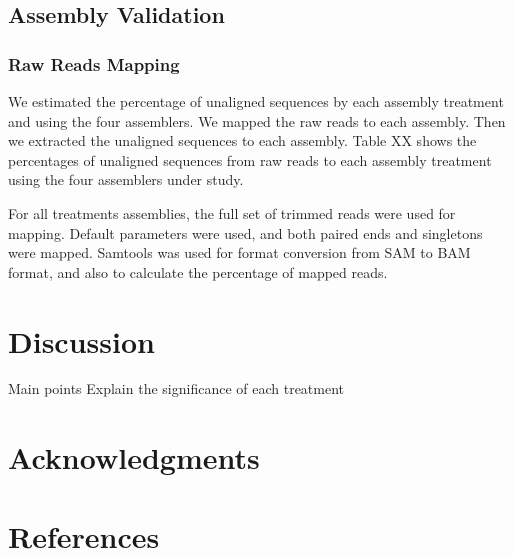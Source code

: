 

 
\subsection*{Assembly Validation}
\subsubsection*{Raw Reads Mapping}

We estimated the percentage of unaligned sequences  by each assembly treatment and using the four assemblers. We mapped the raw reads to each assembly. Then we extracted the unaligned sequences to each assembly. 
Table XX shows the percentages of unaligned sequences from raw reads to each assembly treatment using the four assemblers under study. 

For all treatments assemblies, the full set of trimmed reads were used for mapping. Default parameters were used, and both paired ends and singletons were mapped. Samtools  \cite{samtools} was used for format conversion from SAM to BAM format, and also to calculate the percentage of mapped reads.  

\section*{Discussion}
Main points
Explain the significance of each treatment
 
 
  

\section*{Acknowledgments}


\section*{References}

